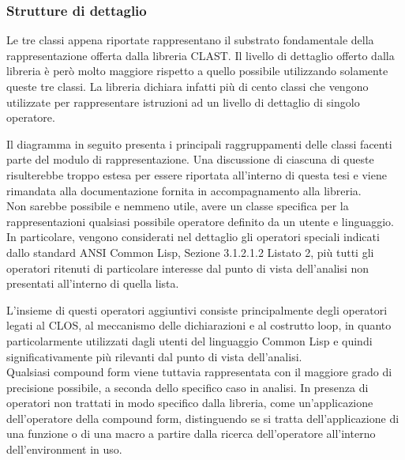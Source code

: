\subsubsection{Strutture di dettaglio}

Le tre classi appena riportate rappresentano il substrato fondamentale della
rappresentazione offerta dalla libreria CLAST. Il livello di dettaglio offerto
dalla libreria è però molto maggiore rispetto a quello possibile utilizzando
solamente queste tre classi. La libreria dichiara infatti più di cento classi
che vengono utilizzate per rappresentare istruzioni ad un livello di dettaglio
di singolo operatore.

Il diagramma in seguito presenta i principali raggruppamenti delle classi
facenti parte del modulo di rappresentazione. Una discussione di ciascuna di
queste risulterebbe troppo estesa per essere riportata all’interno di questa
tesi e viene rimandata alla documentazione fornita in accompagnamento alla
libreria.\\

Non sarebbe possibile e nemmeno utile, avere un classe specifica per la
rappresentazioni qualsiasi possibile operatore definito da un utente e
linguaggio. In particolare, vengono considerati nel dettaglio gli operatori
speciali indicati dallo standard ANSI Common Lisp, Sezione 3.1.2.1.2 Listato
2, più tutti gli operatori ritenuti di particolare interesse dal punto di
vista dell’analisi non presentati all’interno di quella lista.

L'insieme di questi operatori aggiuntivi consiste principalmente degli
operatori legati al CLOS, al meccanismo delle dichiarazioni e al costrutto
loop, in quanto particolarmente utilizzati dagli utenti del linguaggio Common
Lisp e quindi significativamente più rilevanti dal punto di vista
dell’analisi.\\

Qualsiasi compound form viene tuttavia rappresentata con il maggiore grado di
precisione possibile, a seconda dello specifico caso in analisi. In presenza
di operatori non trattati in modo specifico dalla libreria, come
un'applicazione dell'operatore della compound form, distinguendo se si tratta
dell’applicazione di una funzione o di una macro a partire dalla ricerca
dell'operatore all'interno dell'environment in uso.
